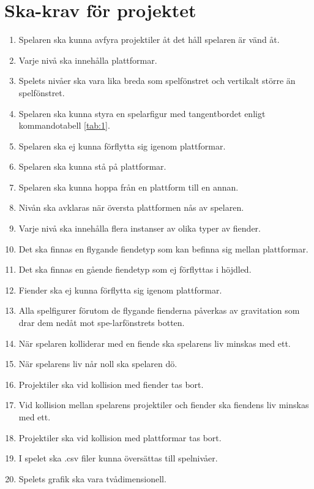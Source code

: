 \documentclass{TDP005mall}
\begin{document}
\section{Ska-krav för projektet} %
\begin{enumerate}
\item Spelaren ska kunna avfyra projektiler åt det håll spelaren är vänd åt.
\item Varje nivå ska innehålla plattformar.
\item Spelets nivåer ska vara lika breda som spelfönstret och vertikalt större än spelfönstret.
\item Spelaren ska kunna styra en spelarfigur med tangentbordet enligt kommandotabell \ref{tab:1}.
\item Spelaren ska ej kunna förflytta sig igenom plattformar.
\item Spelaren ska kunna stå på plattformar.
\item Spelaren ska kunna hoppa från en plattform till en annan.
\item Nivån ska avklaras när översta plattformen nås av spelaren.
\item Varje nivå ska innehålla flera instanser av olika typer av fiender.
\item Det ska finnas en flygande fiendetyp som kan befinna sig mellan plattformar.
\item Det ska finnas en gående fiendetyp som ej förflyttas i höjdled.
\item Fiender ska ej kunna förflytta sig igenom plattformar.
\item Alla spelfigurer förutom de flygande fienderna påverkas av gravitation som drar dem nedåt mot spe-larfönstrets botten.
\item När spelaren kolliderar med en fiende ska spelarens liv minskas med ett.
\item När spelarens liv når noll ska spelaren dö.
\item Projektiler ska vid kollision med fiender tas bort.
\item Vid kollision mellan spelarens projektiler och fiender ska fiendens liv minskas med ett.
\item Projektiler ska vid kollision med plattformar tas bort.
\item I spelet ska .csv filer kunna översättas till spelnivåer.
\item Spelets grafik ska vara tvådimensionell.
\end{enumerate}
\end{document}
